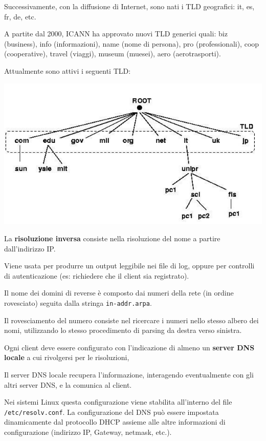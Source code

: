         Successivamente, con la diffusione di Internet, sono nati i TLD geografici: it, es, fr, de, etc.

        A partite dal 2000, ICANN ha approvato nuovi TLD generici quali: biz (business), info (informazioni), name (nome di persona), pro (professionali), coop (cooperative), travel (viaggi), museum (muesei), aero (aerotrasporti).

        Attualmente sono attivi i seguenti TLD:
        
        \begin{center}
            \includegraphics[scale=0.45]{chapters/6/assets/schema_c.png}
        \end{center}

        La \textbf{risoluzione inversa} consiste nella risoluzione del nome a partire dall'indirizzo IP.

        Viene usata per produrre un output leggibile nei file di log, oppure per controlli di autenticazione (es: richiedere che il client sia registrato).

        Il nome dei domini di reverse è composto dai numeri della rete (in ordine rovesciato) seguita dalla stringa \verb:in-addr.arpa:.

        Il rovesciamento del numero consiste nel ricercare i numeri nello stesso albero dei nomi, utilizzando lo stesso procedimento di parsing da destra verso sinistra.

        Ogni client deve essere configurato con l'indicazione di almeno un \textbf{server DNS locale} a cui rivolgersi per le risoluzioni,

        Il server DNS locale recupera l'informazione, interagendo eventualmente con gli altri server DNS, e la comunica al client.

        Nei sistemi Linux questa configurazione viene stabilita all'interno del file \verb:/etc/resolv.conf:. La configurazione del DNS può essere impostata dinamicamente dal protocollo DHCP assieme alle altre informazioni di configurazione (indirizzo IP, Gateway, netmask, etc.).

